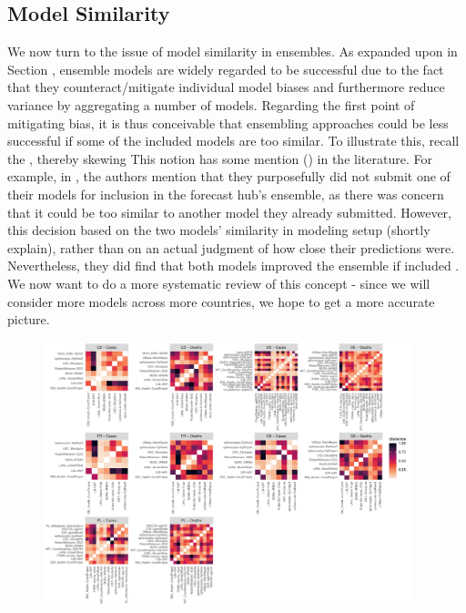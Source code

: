 \subsection{Model Similarity}
We now turn to the issue of model similarity in ensembles. As expanded upon in Section , ensemble models are widely regarded to be successful due to the fact that they counteract/mitigate individual model biases and furthermore reduce variance by aggregating a number of models. Regarding the first point of mitigating bias, it is thus conceivable that ensembling approaches could be less successful if some of the included models are too similar. To illustrate this, recall the , thereby skewing 
This notion has some mention () in the literature. For example, in \cite{bosse_comparing_2021-1}, the authors mention that they purposefully did not submit one of their models for inclusion in the forecast hub's ensemble, as there was concern that it could be too similar to another model they already submitted. However, this decision based on the two models' similarity in modeling setup (shortly explain), rather than on an actual judgment of how close their predictions were. Nevertheless, they did find that both models improved the ensemble if included . We now want to do a more systematic review of this concept - since we will consider more models across more countries, we hope to get a more accurate picture.\\
\begin{figure}
\centering
\includegraphics[width = 0.95\textwidth]{../plots/model_similarity.pdf}
\end{figure}
\newpage
